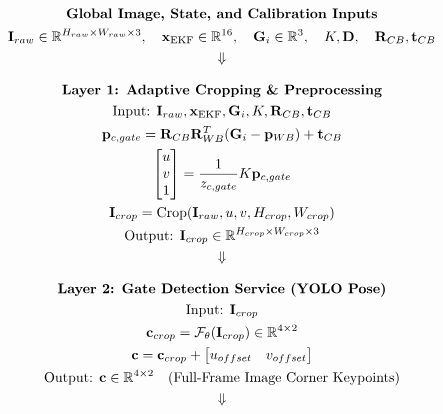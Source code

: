 \documentclass{article}
\begin{document}
\begin{tcolorbox}[colback=gray!5, colframe=black, arc=2mm, title=\textbf{Vision Pipeline Thread ($T_1$) Architecture Stack}, center title]
\vspace{-0.5em}
$$
\begin{gathered}
    \text{\textbf{Global Image, State, and Calibration Inputs}} \\
    \mathbf{I}_{raw} \in \mathbb{R}^{H_{raw} \times W_{raw} \times 3}, \quad \mathbf{x}_{\text{EKF}} \in \mathbb{R}^{16}, \quad \mathbf{G}_i \in \mathbb{R}^3, \quad K, \mathbf{D}, \quad \mathbf{R}_{CB}, \mathbf{t}_{CB} \\
    \Downarrow
\end{gathered}
$$

$$
\begin{gathered}
    \text{\textbf{Layer 1: Adaptive Cropping \& Preprocessing}} \\
    \text{Input: } \mathbf{I}_{raw}, \mathbf{x}_{\text{EKF}}, \mathbf{G}_i, K, \mathbf{R}_{CB}, \mathbf{t}_{CB} \\
    \mathbf{p}_{c, gate} = \mathbf{R}_{CB} \mathbf{R}_{WB}^T (\mathbf{G}_i - \mathbf{p}_{WB}) + \mathbf{t}_{CB} \\
    \begin{bmatrix} u \\ v \\ 1 \end{bmatrix} = \frac{1}{z_{c, gate}} K \mathbf{p}_{c, gate} \\
    \mathbf{I}_{crop} = \text{Crop}(\mathbf{I}_{raw}, u, v, H_{crop}, W_{crop}) \\
    \text{Output: } \mathbf{I}_{crop} \in \mathbb{R}^{H_{crop} \times W_{crop} \times 3} \\
    \Downarrow
\end{gathered}
$$

$$
\begin{gathered}
    \text{\textbf{Layer 2: Gate Detection Service (YOLO Pose)}} \\
    \text{Input: } \mathbf{I}_{crop} \\
    \mathbf{c}_{crop} = \mathcal{F}_{\theta}(\mathbf{I}_{crop}) \in \mathbb{R}^{4 \times 2} \\
    \mathbf{c} = \mathbf{c}_{crop} + \begin{bmatrix} u_{offset} & v_{offset} \end{bmatrix} \\
    \text{Output: } \mathbf{c} \in \mathbb{R}^{4 \times 2} \quad \text{(Full-Frame Image Corner Keypoints)} \\
    \Downarrow
\end{gathered}
$$


\end{tcolorbox}
\end{document}
